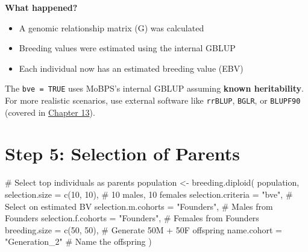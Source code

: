 \documentclass[
  letterpaper,
]{book}
\newenvironment{Shaded}{\begin{snugshade}}{\end{snugshade}}
\newcommand{\AttributeTok}[1]{\textcolor[rgb]{0.40,0.45,0.13}{#1}}
\newcommand{\CommentTok}[1]{\textcolor[rgb]{0.37,0.37,0.37}{#1}}
\newcommand{\DecValTok}[1]{\textcolor[rgb]{0.68,0.00,0.00}{#1}}
\newcommand{\FunctionTok}[1]{\textcolor[rgb]{0.28,0.35,0.67}{#1}}
\newcommand{\NormalTok}[1]{\textcolor[rgb]{0.00,0.23,0.31}{#1}}
\newcommand{\OtherTok}[1]{\textcolor[rgb]{0.00,0.23,0.31}{#1}}
\newcommand{\StringTok}[1]{\textcolor[rgb]{0.13,0.47,0.30}{#1}}
\providecommand{\tightlist}{%
  \setlength{\itemsep}{0pt}\setlength{\parskip}{0pt}}
\begin{document}
\textbf{What happened?}

\begin{itemize}
\tightlist
\item
  A genomic relationship matrix (G) was calculated
\item
  Breeding values were estimated using the internal GBLUP
\item
  Each individual now has an estimated breeding value (EBV)
\end{itemize}

\begin{tcolorbox}[enhanced jigsaw, breakable, coltitle=black, opacitybacktitle=0.6, left=2mm, colframe=quarto-callout-note-color-frame, toprule=.15mm, colback=white, bottomtitle=1mm, colbacktitle=quarto-callout-note-color!10!white, opacityback=0, leftrule=.75mm, toptitle=1mm, rightrule=.15mm, arc=.35mm, titlerule=0mm, title=\textcolor{quarto-callout-note-color}{\faInfo}\hspace{0.5em}{Internal BVE Method}, bottomrule=.15mm]

The \texttt{bve\ =\ TRUE} uses MoBPS's internal GBLUP assuming
\textbf{known heritability}. For more realistic scenarios, use external
software like \texttt{rrBLUP}, \texttt{BGLR}, or \texttt{BLUPF90}
(covered in \hyperref[sec-genomic-prediction]{Chapter 13}).

\end{tcolorbox}

\section{Step 5: Selection of Parents}\label{sec-selection}

\begin{Shaded}
\begin{Highlighting}[]
\CommentTok{\# Select top individuals as parents}
\NormalTok{population }\OtherTok{\textless{}{-}} \FunctionTok{breeding.diploid}\NormalTok{(}
\NormalTok{  population,}
  \AttributeTok{selection.size =} \FunctionTok{c}\NormalTok{(}\DecValTok{10}\NormalTok{, }\DecValTok{10}\NormalTok{),         }\CommentTok{\# 10 males, 10 females}
  \AttributeTok{selection.criteria =} \StringTok{"bve"}\NormalTok{,         }\CommentTok{\# Select on estimated BV}
  \AttributeTok{selection.m.cohorts =} \StringTok{"Founders"}\NormalTok{,   }\CommentTok{\# Males from Founders}
  \AttributeTok{selection.f.cohorts =} \StringTok{"Founders"}\NormalTok{,   }\CommentTok{\# Females from Founders}
  \AttributeTok{breeding.size =} \FunctionTok{c}\NormalTok{(}\DecValTok{50}\NormalTok{, }\DecValTok{50}\NormalTok{),          }\CommentTok{\# Generate 50M + 50F offspring}
  \AttributeTok{name.cohort =} \StringTok{"Generation\_2"}        \CommentTok{\# Name the offspring}
\NormalTok{)}
\end{Highlighting}
\end{Shaded}
\end{document}
